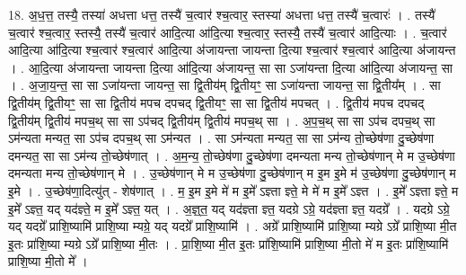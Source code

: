 \documentclass[17pt]{extarticle}
\begin{document}
18. अ॒ध॒त्त॒ तस्यै॒ तस्या॑ अधत्ता धत्त॒ तस्यै॑ च॒त्वार॑ श्च॒त्वार॒ स्तस्या॑ अधत्ता धत्त॒ तस्यै॑ च॒त्वारः॑ । . तस्यै॑ च॒त्वार॑ श्च॒त्वार॒ स्तस्यै॒ तस्यै॑ च॒त्वार॑ आदि॒त्या आ॑दि॒त्या श्च॒त्वार॒ स्तस्यै॒ तस्यै॑ च॒त्वार॑ आदि॒त्याः । . च॒त्वार॑ आदि॒त्या आ॑दि॒त्या श्च॒त्वार॑ श्च॒त्वार॑ आदि॒त्या अ॑जायन्ता जायन्ता दि॒त्या श्च॒त्वार॑ श्च॒त्वार॑ आदि॒त्या अ॑जायन्त । . आ॒दि॒त्या अ॑जायन्ता जायन्ता दि॒त्या आ॑दि॒त्या अ॑जायन्त॒ सा सा ऽजा॑यन्ता दि॒त्या आ॑दि॒त्या अ॑जायन्त॒ सा । . अ॒जा॒य॒न्त॒ सा सा ऽजा॑यन्ता जायन्त॒ सा द्वि॒तीय॑म् द्वि॒तीयꣳ॒॒ सा ऽजा॑यन्ता जायन्त॒ सा द्वि॒तीय᳚म् । . सा द्वि॒तीय॑म् द्वि॒तीयꣳ॒॒ सा सा द्वि॒तीय॑ मपच दपचद् द्वि॒तीयꣳ॒॒ सा सा द्वि॒तीय॑ मपचत् । . द्वि॒तीय॑ मपच दपचद् द्वि॒तीय॑म् द्वि॒तीय॑ मपच॒थ् सा सा ऽप॑चद् द्वि॒तीय॑म् द्वि॒तीय॑ मपच॒थ् सा । . अ॒प॒च॒थ् सा सा ऽप॑च दपच॒थ् सा ऽम॑न्यता मन्यत॒ सा ऽप॑च दपच॒थ् सा ऽम॑न्यत । . सा ऽम॑न्यता मन्यत॒ सा सा ऽम॑न्य तो॒च्छेष॑णा दु॒च्छेष॑णा दमन्यत॒ सा सा ऽम॑न्य तो॒च्छेष॑णात् । . अ॒म॒न्य॒ तो॒च्छेष॑णा दु॒च्छेष॑णा दमन्यता मन्य तो॒च्छेष॑णान् मे म उ॒च्छेष॑णा दमन्यता मन्य
तो॒च्छेष॑णान् मे । . उ॒च्छेष॑णान् मे म उ॒च्छेष॑णा दु॒च्छेष॑णान् म इ॒म इ॒मे म॑ उ॒च्छेष॑णा दु॒च्छेष॑णान् म इ॒मे । . उ॒च्छेष॑णा॒दित्यु॑त् - शेष॑णात् । . म॒ इ॒म इ॒मे मे॑ म इ॒मे᳚ ऽज्ञ्ता ज्ञ्ते॒ मे मे॑ म इ॒मे᳚ ऽज्ञ्त । . इ॒मे᳚ ऽज्ञ्ता ज्ञ्ते॒ म इ॒मे᳚ ऽज्ञ्त॒ यद् यद॑ज्ञ्ते॒ म इ॒मे᳚ ऽज्ञ्त॒ यत् । . अ॒ज्ञ्॒त॒ यद् यद॑ज्ञ्ता ज्ञ्त॒ यदग्रे ऽग्रे॒ यद॑ज्ञ्ता ज्ञ्त॒ यदग्रे᳚ । . यदग्रे ऽग्रे॒ यद् यदग्रे᳚ प्राशि॒ष्यामि॑ प्राशि॒ष्या म्यग्रे॒ यद् यदग्रे᳚ प्राशि॒ष्यामि॑ । . अग्रे᳚ प्राशि॒ष्यामि॑ प्राशि॒ष्या म्यग्रे ऽग्रे᳚ प्राशि॒ष्या मी॒त इ॒तः प्रा॑शि॒ष्या म्यग्रे ऽग्रे᳚ प्राशि॒ष्या मी॒तः । . प्रा॒शि॒ष्या मी॒त इ॒तः प्रा॑शि॒ष्यामि॑ प्राशि॒ष्या मी॒तो मे॑ म इ॒तः प्रा॑शि॒ष्यामि॑ प्राशि॒ष्या मी॒तो मे᳚ । \newline
\end{document}
